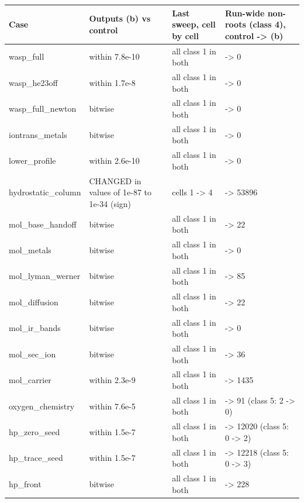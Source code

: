 \documentclass[english,a4paper]{my_memo}
\begin{document}
{\def\LTcaptype{none} %
{\small
\begin{longtable}[]{@{}>{\raggedright\arraybackslash}p{\dimexpr(\linewidth-8\tabcolsep)/4\relax}>{\raggedright\arraybackslash}p{\dimexpr(\linewidth-8\tabcolsep)/4\relax}>{\raggedright\arraybackslash}p{\dimexpr(\linewidth-8\tabcolsep)/4\relax}>{\raggedright\arraybackslash}p{\dimexpr(\linewidth-8\tabcolsep)/4\relax}@{}}
\toprule\noalign{}
Case & Outputs (b) vs control & Last sweep, cell by cell & Run-wide non-roots (class 4), control -\textgreater{} (b) \\
\midrule\noalign{}
\endhead
\bottomrule\noalign{}
\endlastfoot
wasp\_full & within 7.8e-10 & all class 1 in both & 0 -\textgreater{} 0 \\
wasp\_he23off & within 1.7e-8 & all class 1 in both & 0 -\textgreater{} 0 \\
wasp\_full\_newton & bitwise & all class 1 in both & 0 -\textgreater{} 0 \\
iontrans\_metals & bitwise & all class 1 in both & 0 -\textgreater{} 0 \\
lower\_profile & within 2.6e-10 & all class 1 in both & 0 -\textgreater{} 0 \\
hydrostatic\_column & CHANGED in values of 1e-87 to 1e-34 (sign) & 166 cells 1 -\textgreater{} 4 & 0 -\textgreater{} 53896 \\
mol\_base\_handoff & bitwise & all class 1 in both & 16 -\textgreater{} 22 \\
mol\_metals & bitwise & all class 1 in both & 0 -\textgreater{} 0 \\
mol\_lyman\_werner & bitwise & all class 1 in both & 83 -\textgreater{} 85 \\
mol\_diffusion & bitwise & all class 1 in both & 16 -\textgreater{} 22 \\
mol\_ir\_bands & bitwise & all class 1 in both & 0 -\textgreater{} 0 \\
mol\_sec\_ion & bitwise & all class 1 in both & 36 -\textgreater{} 36 \\
mol\_carrier & within 2.3e-9 & all class 1 in both & 1422 -\textgreater{} 1435 \\
oxygen\_chemistry & within 7.6e-5 & all class 1 in both & 30 -\textgreater{} 91 (class 5: 2 -\textgreater{} 0) \\
hp\_zero\_seed & within 1.5e-7 & all class 1 in both & 1188 -\textgreater{} 12020 (class 5: 0 -\textgreater{} 2) \\
hp\_trace\_seed & within 1.5e-7 & all class 1 in both & 1384 -\textgreater{} 12218 (class 5: 0 -\textgreater{} 3) \\
hp\_front & bitwise & all class 1 in both & 184 -\textgreater{} 228 \\
\end{longtable}
}
}
\end{document}
